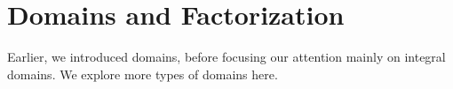 \chapter{Domains and Factorization}
Earlier, we introduced domains, before focusing our attention mainly on integral domains. We explore more types of domains here.
